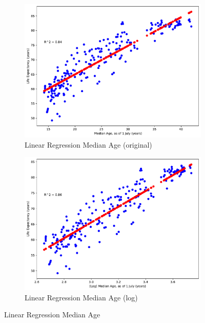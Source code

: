 \documentclass[a4paper]{article}
\begin{document}
\begin{figure}
  \centering
  \begin{subfigure}[a]{\textwidth}
      \centering
      \includegraphics[width=\textwidth]{ola/_linear_regression_median_age,_as_of_1_july_(years).pdf}
      \caption{Linear Regression Median Age (original)}
      \label{fig:reg_median_age}
  \end{subfigure}
  \vfill
  \begin{subfigure}[b]{\textwidth}
      \centering
      \includegraphics[width=\textwidth]{ola/[log]_linear_regression_median_age,_as_of_1_july_(years).pdf}
      \caption{Linear Regression Median Age (log)}
      \label{fig:reg_median_age_log}
  \end{subfigure}
  \caption{Linear Regression Median Age}
  \label{fig:easy_ham_and_spam_confusion_matrix}
\end{figure}
\end{document}
